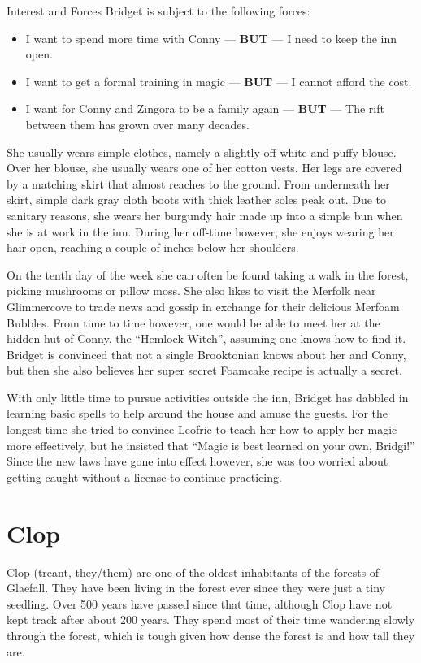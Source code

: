 \begin{multicols}{2}
\begin{DndSidebar}{Interest and Forces}
    Bridget is subject to the following forces:
    \begin{itemize}
        \item{I want to spend more time with Conny --- \textbf{BUT} --- I need to keep the inn open.}
        \item{I want to get a formal training in magic --- \textbf{BUT} --- I cannot afford the cost.}
        \item{I want for Conny and Zingora to be a family again --- \textbf{BUT} --- The rift between them has grown over many decades.}
    \end{itemize}
\end{DndSidebar}

She usually wears simple clothes, namely a slightly off-white and puffy blouse.
Over her blouse, she usually wears one of her cotton vests.
Her legs are covered by a matching skirt that almost reaches to the ground.
From underneath her skirt, simple dark gray cloth boots with thick leather soles peak out.
Due to sanitary reasons, she wears her burgundy hair made up into a simple bun when she is at work in the inn.
During her off-time however, she enjoys wearing her hair open, reaching a couple of inches below her shoulders.

On the tenth day of the week she can often be found taking a walk in the forest, picking mushrooms or pillow moss.
She also likes to visit the Merfolk near Glimmercove to trade news and gossip in exchange for their delicious Merfoam Bubbles.
From time to time however, one would be able to meet her at the hidden hut of Conny, the ``Hemlock Witch'', assuming one knows how to find it.
Bridget is convinced that not a single Brooktonian knows about her and Conny, but then she also believes her super secret Foamcake recipe is actually a secret.

With only little time to pursue activities outside the inn, Bridget has dabbled in learning basic spells to help around the house and amuse the guests.
For the longest time she tried to convince Leofric to teach her how to apply her magic more effectively, but he insisted that ``Magic is best learned on your own, Bridgi!''
Since the new laws have gone into effect however, she was too worried about getting caught without a license to continue practicing.

\section{Clop}

Clop (treant, they/them) are one of the oldest inhabitants of the forests of Glaefall.
They have been living in the forest ever since they were just a tiny seedling.
Over 500 years have passed since that time, although Clop have not kept track after about 200 years.
They spend most of their time wandering slowly through the forest, which is tough given how dense the forest is and how tall they are.


\end{multicols}
